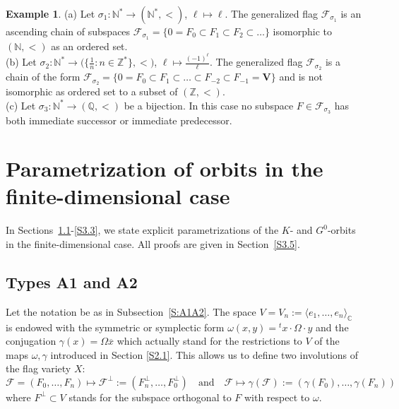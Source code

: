 \documentclass{amsart}
\theoremstyle{definition}
\newtheorem{example}{Example}
\begin{document}
\begin{example}
{\rm (a)} Let $\sigma_1:\mathbb{N}^*\to(\mathbb{N}^*,<)$, $\ell\mapsto\ell$.
The generalized flag $\mathcal{F}_{\sigma_1}$ is an ascending chain of subspaces
$\mathcal{F}_{\sigma_1}=\{0=F_0\subset F_1\subset F_2\subset\ldots\}$ isomorphic to $(\mathbb{N},<)$ as an ordered set. 
\\
{\rm (b)} Let $\sigma_2:\mathbb{N}^*\to\Big(\{\frac{1}{n}:n\in\mathbb{Z}^*\},<\Big)$, $\ell\mapsto \frac{(-1)^\ell}{\ell}$.
The generalized flag $\mathcal{F}_{\sigma_2}$ is a chain of the form
$\mathcal{F}_{\sigma_2}=\{0=F_0\subset F_1\subset\ldots\subset F_{-2}\subset F_{-1}=\mathbf{V}\}$
and is not isomorphic as ordered set to a subset of $(\mathbb{Z},<)$.
\\
{\rm (c)} Let $\sigma_3:\mathbb{N}^*\to(\mathbb{Q},<)$ be a bijection.
In this case no subspace $F\in\mathcal{F}_{\sigma_3}$ has both immediate successor or immediate predecessor.

\end{example}



\section{Parametrization of orbits in the finite-dimensional case}

\label{S3}

In Sections~\ref{S3.1}-\ref{S3.3}, we state explicit parametrizations of the $K$- and $G^0$-orbits in the finite-dimensional case.  All proofs are given in Section~\ref{S3.5}.

\subsection{Types A1 and A2}
\label{S3.1}
Let the notation be as in Subsection~\ref{S:A1A2}.
The space $V=V_n:=\langle e_1,\ldots,e_n\rangle_\mathbb{C}$ is endowed with the symmetric
or symplectic form $\omega(x,y)={}^tx\cdot \Omega\cdot y$ and the conjugation $\gamma(x)=\Omega\overline{x}$ which actually stand for the restrictions to $V$ of the maps $\omega,\gamma$ introduced in Section \ref{S2.1}.
This allows us to define two involutions of the flag variety $X$:
\[
\mathcal{F}=(F_0,\ldots,F_n)\mapsto\mathcal{F}^\perp:=(F_n^\perp,\ldots,F_0^\perp)
\quad\mbox{and}\quad
\mathcal{F}\mapsto\gamma(\mathcal{F}):=(\gamma(F_0),\ldots,\gamma(F_n))
\]
where $F^\perp\subset V$ stands for the subspace orthogonal to $F$ with respect to $\omega$.
\end{document}
